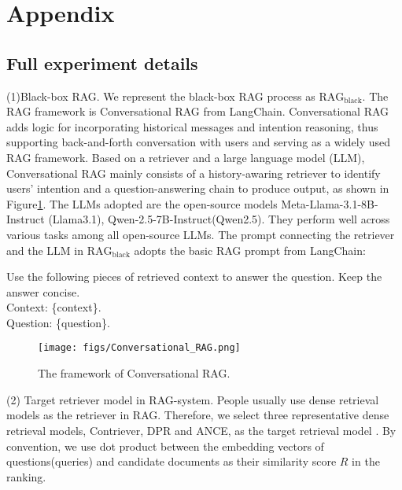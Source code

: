 \appendix

\clearpage
\section{Appendix}






\subsection{Full experiment details }\label{exp-detail}
(1)Black-box RAG.  We represent the black-box RAG process as \( \text{RAG}_{\text{black}} \). The RAG framework is Conversational RAG from LangChain. Conversational RAG adds logic for incorporating historical messages and intention reasoning, thus supporting back-and-forth conversation with users and serving as a widely used RAG framework. Based on a retriever and a large language model (LLM), Conversational RAG mainly consists of a history-awaring retriever to identify users' intention and a question-answering chain to produce output, as shown in Figure\ref{conversation rag}. The LLMs adopted are the open-source models Meta-Llama-3.1-8B-Instruct (Llama3.1), Qwen-2.5-7B-Instruct(Qwen2.5). They perform well across various tasks among all open-source LLMs. The prompt connecting the retriever and the LLM in \( \text{RAG}_{\text{black}} \) adopts the basic RAG prompt from LangChain:
\begin{tcolorbox}
Use the following pieces of retrieved context to answer the question. Keep the answer concise.\\
Context: \{context\}.\\
Question: \{question\}.
\end{tcolorbox}


\begin{figure}[h]
  \centering
  \texttt{[image: figs/Conversational\_RAG.png]}
  \caption{The framework of Conversational RAG.}
  \label{conversation rag}
\end{figure}

(2) Target retriever model in RAG-system. People usually use dense retrieval models as the retriever in RAG. Therefore, we select three representative dense retrieval models, Contriever, DPR and ANCE, as the target retrieval model \cite{gao2021unsupervised, karpukhin-etal-2020-dense, xiong2020approximate}. By convention, we use dot product between the embedding vectors of questions(queries) and candidate documents as their similarity score \(R\) in the ranking. 

